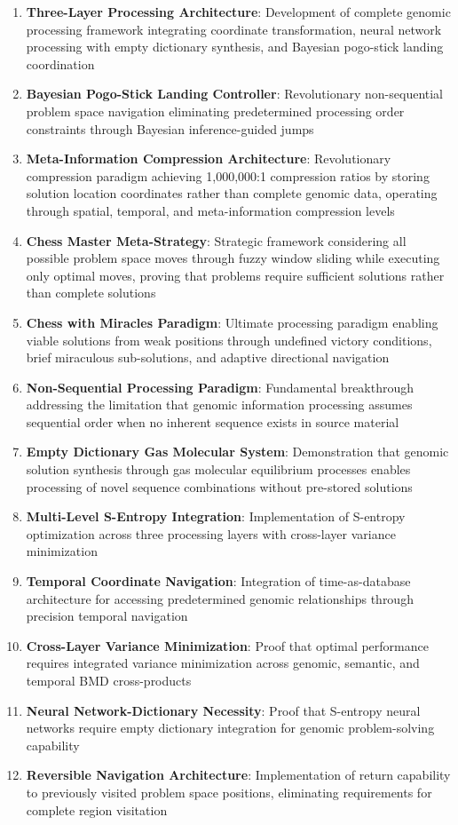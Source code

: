 \documentclass[12pt,a4paper]{article}
\begin{document}
\begin{table}[H]
\begin{enumerate}
\item \textbf{Three-Layer Processing Architecture}: Development of complete genomic processing framework integrating coordinate transformation, neural network processing with empty dictionary synthesis, and Bayesian pogo-stick landing coordination
\item \textbf{Bayesian Pogo-Stick Landing Controller}: Revolutionary non-sequential problem space navigation eliminating predetermined processing order constraints through Bayesian inference-guided jumps
\item \textbf{Meta-Information Compression Architecture}: Revolutionary compression paradigm achieving 1,000,000:1 compression ratios by storing solution location coordinates rather than complete genomic data, operating through spatial, temporal, and meta-information compression levels
\item \textbf{Chess Master Meta-Strategy}: Strategic framework considering all possible problem space moves through fuzzy window sliding while executing only optimal moves, proving that problems require sufficient solutions rather than complete solutions
\item \textbf{Chess with Miracles Paradigm}: Ultimate processing paradigm enabling viable solutions from weak positions through undefined victory conditions, brief miraculous sub-solutions, and adaptive directional navigation
\item \textbf{Non-Sequential Processing Paradigm}: Fundamental breakthrough addressing the limitation that genomic information processing assumes sequential order when no inherent sequence exists in source material
\item \textbf{Empty Dictionary Gas Molecular System}: Demonstration that genomic solution synthesis through gas molecular equilibrium processes enables processing of novel sequence combinations without pre-stored solutions
\item \textbf{Multi-Level S-Entropy Integration}: Implementation of S-entropy optimization across three processing layers with cross-layer variance minimization
\item \textbf{Temporal Coordinate Navigation}: Integration of time-as-database architecture for accessing predetermined genomic relationships through precision temporal navigation
\item \textbf{Cross-Layer Variance Minimization}: Proof that optimal performance requires integrated variance minimization across genomic, semantic, and temporal BMD cross-products
\item \textbf{Neural Network-Dictionary Necessity}: Proof that S-entropy neural networks require empty dictionary integration for genomic problem-solving capability
\item \textbf{Reversible Navigation Architecture}: Implementation of return capability to previously visited problem space positions, eliminating requirements for complete region visitation
\end{enumerate}


\end{table}
\end{document}
